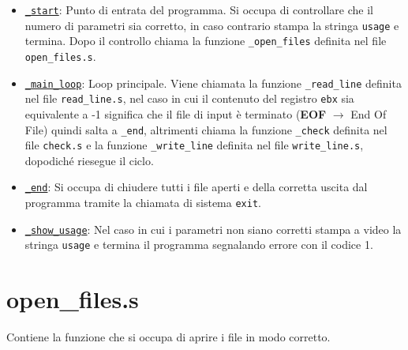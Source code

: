 \documentclass[a4paper,11pt]{article}
\newcommand{\itemtt}[1]{\item \texttt{#1}}
\newcommand{\myparagraph}[2]{
	\begin{table}[!ht]
		\begin{tabular}{p{0.175\linewidth} | p{0.8\linewidth}}
			\texttt{#1} & #2
		\end{tabular}
	\end{table}
			}
\begin{document}
	\begin{itemize}
		\itemtt{\hyperref[e:1:1]{\_start}}: Punto di entrata del programma. Si occupa di controllare che il numero di parametri sia corretto, in caso contrario stampa la stringa \texttt{usage} e termina. Dopo il controllo chiama la funzione \texttt{\_open\_files} definita nel file \texttt{open\_files.s}. 
		\itemtt{\hyperref[e:1:2]{\_main\_loop}}: Loop principale. Viene chiamata la funzione \texttt{\_read\_line} definita nel file \texttt{read\_line.s}, nel caso in cui il contenuto del registro \texttt{ebx} sia equivalente a -1 significa che il file di input è terminato (\textbf{EOF} $\rightarrow$ End Of File) quindi salta a \texttt{\_end}, altrimenti chiama la funzione \texttt{\_check} definita nel file \texttt{check.s} e la funzione \texttt{\_write\_line} definita nel file \texttt{write\_line.s}, dopodiché riesegue il ciclo.
		\itemtt{\hyperref[e:1:3]{\_end}}: Si occupa di chiudere tutti i file aperti e della corretta uscita dal programma tramite la chiamata di sistema \texttt{exit}.
		\itemtt{\hyperref[e:1:4]{\_show\_usage}}: Nel caso in cui i parametri non siano corretti stampa a video la stringa \texttt{usage} e termina il programma segnalando errore con il codice 1.
	\end{itemize}  
	
	\section{open\_files.s}
	Contiene la funzione che si occupa di aprire i file in modo corretto.
	
\end{document}
